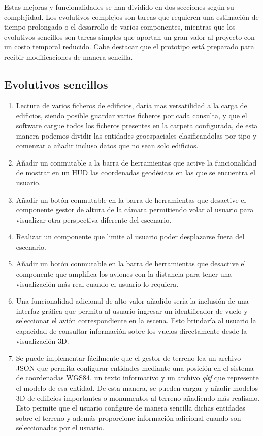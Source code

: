 \documentclass[a4paper, 11pt]{book}
\begin{document}
Estas mejoras y funcionalidades se han dividido en dos secciones según su complejidad. Los evolutivos complejos son tareas que requieren una estimación de tiempo prolongado o el desarrollo de varios componentes, mientras que los evolutivos sencillos son tareas simples que aportan un gran valor al proyecto con un costo temporal reducido. Cabe destacar que el prototipo está preparado para recibir modificaciones de manera sencilla.
\subsection{Evolutivos sencillos}
\begin{enumerate}
	\item Lectura de varios ficheros de edificios, daría mas versatilidad a la carga de edificios, siendo posible guardar varios ficheros por cada consulta, y que el software cargue todos los ficheros presentes en la carpeta configurada, de esta manera podemos dividir las entidades geoespaciales clasificandolas por tipo y comenzar a añadir incluso datos que no sean solo edificios.
	\item Añadir un conmutable a la barra de herramientas que active la funcionalidad de mostrar en un \textsc{HUD} las coordenadas geodésicas en las que se encuentra el usuario.
	\item Añadir un botón conmutable en la barra de herramientas que desactive el componente gestor de altura de la cámara permitiendo volar al usuario para visualizar otra perspectiva diferente del escenario.
	\item Realizar un componente que limite al usuario poder desplazarse fuera del escenario.
	\item Añadir un botón conmutable en la barra de herramientas que desactive el componente que amplifica los aviones con la distancia para tener una visualización más real cuando el usuario lo requiera.
	\item Una funcionalidad adicional de alto valor añadido sería la inclusión de una interfaz gráfica que permita al usuario ingresar un identificador de vuelo y seleccionar el avión correspondiente en la escena. Esto brindaría al usuario la capacidad de consultar información sobre los vuelos directamente desde la visualización 3D.
	\item Se puede implementar fácilmente que el gestor de terreno lea un archivo \textsc{JSON} que permita configurar entidades mediante una posición en el sistema de coordenadas \textsc{WGS84}, un texto informativo y un archivo \emph{gltf} que represente el modelo de esa entidad. De esta manera, se pueden cargar y añadir modelos \textsc{3D} de edificios importantes o monumentos al terreno añadiendo más realismo. Esto permite que el usuario configure de manera sencilla dichas entidades sobre el terreno y además proporcione información adicional cuando son seleccionadas por el usuario.
\end{enumerate}
\end{document}
